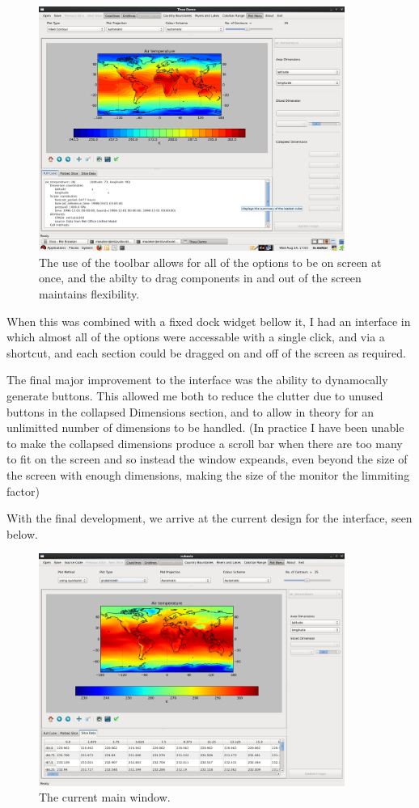 \documentclass[whitecover]{MO_report}
\begin{document}
\begin{figure}[ht!]
\centering
\includegraphics[width=100mm]{resources/basic.png}
\caption{The use of the toolbar allows for all of the options to be on screen
at once, and the abilty to drag components in and out of the screen maintains
flexibility.}
\label{overflow}
\end{figure}

When this was combined with a fixed dock widget bellow it, I had an interface
in which almost all of the options were accessable with a single click, and
via a shortcut, and each section could be dragged on and off of the screen as
required.

The final major improvement to the interface was the ability to dynamocally
generate buttons. This allowed me both to reduce the clutter due to unused
buttons in the collapsed Dimensions section, and to allow in theory for an
unlimitted number of dimensions to be handled. (In practice I have been unable
to make the collapsed dimensions produce a scroll bar when there are too many
to fit on the screen and so instead the window expeands, even beyond the size
of the screen with enough dimensions, making the size of the monitor the
limmiting factor)

With the final development, we arrive at the current design for the interface,
seen below.

\begin{figure}[ht!]
\centering
\includegraphics[width=100mm]{resources/tutorial8.png}
\caption{The current main window.}
\label{overflow}
\end{figure}
\end{document}
